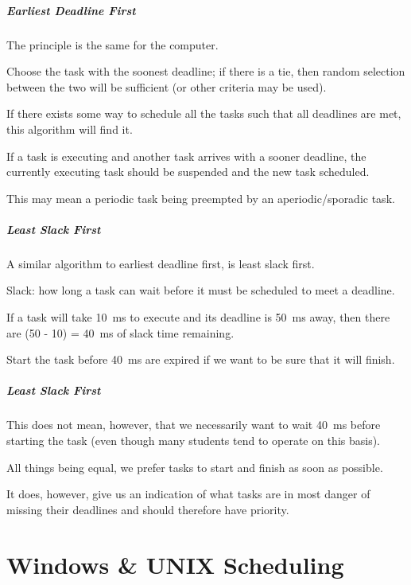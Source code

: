 \begin{frame}
\frametitle{Earliest Deadline First}

The principle is the same for the computer. 

Choose the task with the soonest deadline; if there is a tie, then random selection between the two will be sufficient (or other criteria may be used). 

If there exists some way to schedule all the tasks such that all deadlines are met, this algorithm will find it. 

If a task is executing and another task arrives with a sooner deadline, the currently executing task should be suspended and the new task scheduled. 

This may mean a periodic task being preempted by an aperiodic/sporadic task.


\end{frame}

\begin{frame}
\frametitle{Least Slack First}

A similar algorithm to earliest deadline first, is least slack first.

\alert{Slack}: how long a task can wait before it must be scheduled to meet a deadline.

If a task will take 10~ms to execute and its deadline is 50~ms away, then there are (50 - 10) = 40~ms of slack time remaining.

Start the task before 40~ms are expired if we want to be sure that it will finish. 

\end{frame}



\begin{frame}
\frametitle{Least Slack First}
This does not mean, however, that we necessarily want to wait 40~ms before starting the task (even though many students tend to operate on this basis). 

All things being equal, we prefer tasks to start and finish as soon as possible. 

It does, however, give us an indication of what tasks are in most danger of missing their deadlines and should therefore have priority.

\end{frame}

\part{Windows \& UNIX Scheduling}

